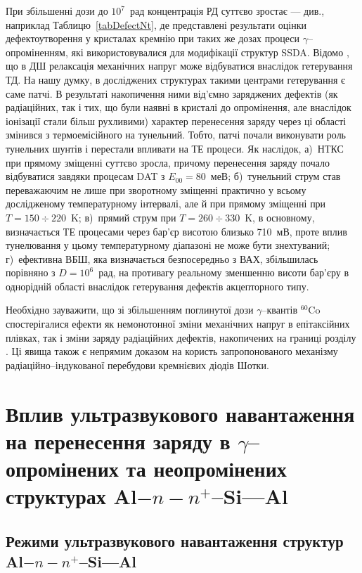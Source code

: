 При збільшенні дози до $10^7$~рад концентрація РД суттєво зростає --- див., наприклад Таблицю~\ref{tabDefectNt}, де представлені результати оцінки дефектоутворення
у кристалах кремнію при таких же дозах процеси $\gamma$--опроміненням, які використовувалися для модифікації
структур SSDA.
Відомо \cite{Boltovets}, що в ДШ релаксація механічних напруг може відбуватися внаслідок гетерування ТД.
На нашу думку, в досліджених структурах такими центрами гетерування є саме патчі.
В результаті накопичення ними від'ємно заряджених дефектів (як радіаційних, так і тих, що були наявні в кристалі до опромінення, але внаслідок іонізації
стали більш рухливими) характер перенесення заряду через ці області змінився з термоемісійного на тунельний.
Тобто, патчі почали виконувати роль тунельних шунтів і перестали впливати на ТЕ процеси.
Як наслідок,
а)~НТКС при прямому зміщенні суттєво зросла, причому перенесення заряду почало відбуватися завдяки процесам DAT з $E_{00}=80$~меВ;
б)~тунельний струм став переважаючим не лише при зворотному зміщенні практично у всьому дослідженому температурному інтервалі,
але й при прямому зміщенні при $T=150\div220$~K;
в)~прямий струм при $T=260\div330$~K, в основному, визначається ТЕ процесами через бар'єр висотою близько 710~мВ,
проте вплив тунелювання у цьому температурному діапазоні не може бути знехтуваний;
г)~ефективна ВБШ, яка визначається безпосередньо з ВАХ, збільшилась порівняно з  $D=10^6$~рад, на противагу реальному зменшенню висоти бар'єру в однорідній області внаслідок гетерування дефектів акцепторного типу.

Необхідно зауважити, що зі збільшенням поглинутої дози $\gamma$--квантів $^{60}$Co спостерігалися ефекти як немонотонної зміни механічних напруг
в епітаксійних плівках, так і зміни заряду радіаційних дефектів, накопичених на границі розділу \cite{Muzafarova, Belyaev}.
Ці явища також є непрямим доказом на користь запропонованого механізму радіаційно--індукованої перебудови кремнієвих діодів Шотки.



\section{Вплив ультразвукового навантаження на перенесення заряду в $\gamma$--опромінених та неопромінених структурах Al$-n-n^+$--Si---Al\label{MSSi_USL}}

\subsection{Режими ультразвукового навантаження структур Al$-n-n^+$--Si---Al}

